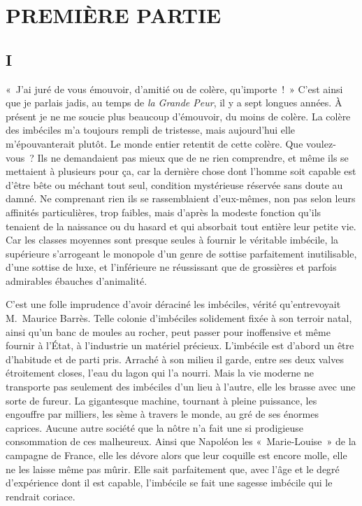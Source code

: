 \documentclass[french,twoside]{book} %
\newcommand{\dateline}[1]{\medskip{\RaggedLeft{#1}\par}\bigskip}
\begin{document}
\dateline{Palma de Majorque, \\
janvier 1937.}
\section[{PREMIÈRE PARTIE}]{PREMIÈRE PARTIE}\renewcommand{\leftmark}{PREMIÈRE PARTIE}

\subsection[{I}]{I}
\noindent « J’ai juré de vous émouvoir, d’amitié ou de colère, qu’importe ! » C’est ainsi que je parlais jadis, au temps de \emph{la Grande Peur}, il y a sept longues années. À présent je ne me soucie plus beaucoup d’émouvoir, du moins de colère. La colère des imbéciles m’a toujours rempli de tristesse, mais aujourd’hui elle m’épouvanterait plutôt. Le monde entier retentit de cette colère. Que voulez-vous ? Ils ne demandaient pas mieux que de ne rien comprendre, et même ils se mettaient à plusieurs pour ça, car la dernière chose dont l’homme soit capable est d’être bête ou méchant tout seul, condition mystérieuse réservée sans doute au damné. Ne comprenant rien ils se rassemblaient d’eux-mêmes, non pas selon leurs affinités particulières, trop faibles, mais d’après la modeste fonction qu’ils tenaient de la naissance ou du hasard et qui absorbait tout entière leur petite vie. Car les classes moyennes sont presque seules à fournir le véritable imbécile, la supérieure s’arrogeant le monopole d’un genre de sottise parfaitement inutilisable, d’une sottise de luxe, et l’inférieure ne réussissant que de grossières et parfois admirables ébauches d’animalité.\par
C’est une folle imprudence d’avoir déraciné les imbéciles, vérité qu’entrevoyait M. Maurice Barrès. Telle colonie d’imbéciles solidement fixée à son terroir natal, ainsi qu’un banc de moules au rocher, peut passer pour inoffensive et même fournir à l’État, à l’industrie un matériel précieux. L’imbécile est d’abord un être d’habitude et de parti pris. Arraché à son milieu il garde, entre ses deux valves étroitement closes, l’eau du lagon qui l’a nourri. Mais la vie moderne ne transporte pas seulement des imbéciles d’un lieu à l’autre, elle les brasse avec une sorte de fureur. La gigantesque machine, tournant à pleine puissance, les engouffre par milliers, les sème à travers le monde, au gré de ses énormes caprices. Aucune autre société que la nôtre n’a fait une si prodigieuse consommation de ces malheureux. Ainsi que Napoléon les « Marie-Louise » de la campagne de France, elle les dévore alors que leur coquille est encore molle, elle ne les laisse même pas mûrir. Elle sait parfaitement que, avec l’âge et le degré d’expérience dont il est capable, l’imbécile se fait une sagesse imbécile qui le rendrait coriace.\par
\end{document}
